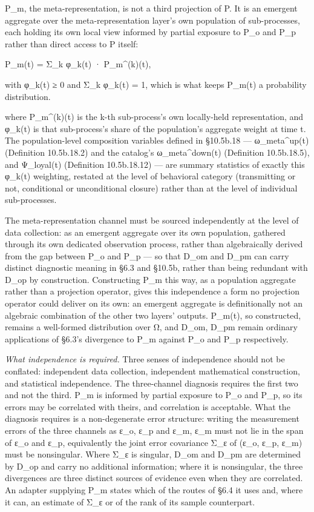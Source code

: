 \documentclass[
]{article}
\begin{document}
P\_m, the meta-representation, is not a third projection of P. It is an
emergent aggregate over the meta-representation layer's own population
of sub-processes, each holding its own local view informed by partial
exposure to P\_o and P\_p rather than direct access to P itself:

P\_m(t) = Σ\_k φ\_k(t) · P\_m\^{}(k)(t),

with φ\_k(t) ≥ 0 and Σ\_k φ\_k(t) = 1, which is what keeps P\_m(t) a
probability distribution.

where P\_m\^{}(k)(t) is the k-th sub-process's own locally-held
representation, and φ\_k(t) is that sub-process's share of the
population's aggregate weight at time t. The population-level
composition variables defined in §10.5b.18 --- ω\_meta\^{}up(t)
(Definition 10.5b.18.2) and the catalog's ω\_meta\^{}down(t) (Definition
10.5b.18.5), and Ψ\_loyal(t) (Definition 10.5b.18.12) --- are summary
statistics of exactly this φ\_k(t) weighting, restated at the level of
behavioral category (transmitting or not, conditional or unconditional
closure) rather than at the level of individual sub-processes.

The meta-representation channel must be sourced independently at the
level of data collection: as an emergent aggregate over its own
population, gathered through its own dedicated observation process,
rather than algebraically derived from the gap between P\_o and P\_p ---
so that D\_om and D\_pm can carry distinct diagnostic meaning in §6.3
and §10.5b, rather than being redundant with D\_op by construction.
Constructing P\_m this way, as a population aggregate rather than a
projection operator, gives this independence a form no projection
operator could deliver on its own: an emergent aggregate is
definitionally not an algebraic combination of the other two layers'
outputs. P\_m(t), so constructed, remains a well-formed distribution
over Ω, and D\_om, D\_pm remain ordinary applications of §6.3's
divergence to P\_m against P\_o and P\_p respectively.

\emph{What independence is required.} Three senses of independence
should not be conflated: independent data collection, independent
mathematical construction, and statistical independence. The
three-channel diagnosis requires the first two and not the third. P\_m
is informed by partial exposure to P\_o and P\_p, so its errors may be
correlated with theirs, and correlation is acceptable. What the
diagnosis requires is a non-degenerate error structure: writing the
measurement errors of the three channels as ε\_o, ε\_p and ε\_m, ε\_m
must not lie in the span of ε\_o and ε\_p, equivalently the joint error
covariance Σ\_ε of (ε\_o, ε\_p, ε\_m) must be nonsingular. Where Σ\_ε is
singular, D\_om and D\_pm are determined by D\_op and carry no
additional information; where it is nonsingular, the three divergences
are three distinct sources of evidence even when they are correlated. An
adapter supplying P\_m states which of the routes of §6.4 it uses and,
where it can, an estimate of Σ\_ε or of the rank of its sample
counterpart.
\end{document}
